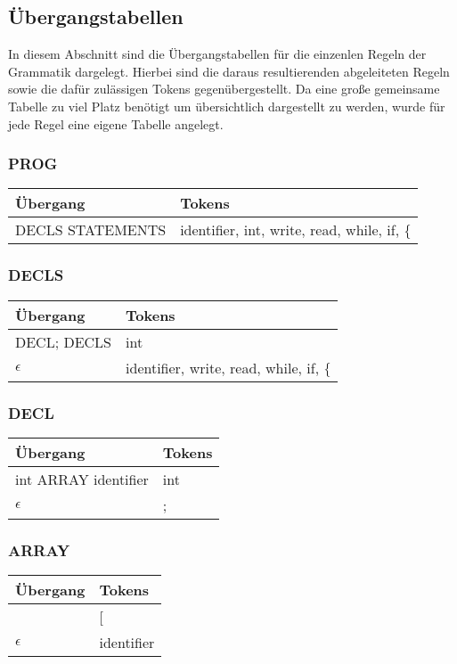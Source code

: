 \documentclass[
a4paper,   %
11pt,      %
oneside,   %
onecolumn, %
final      %
]{article}
\begin{document}
\subsection{\"Ubergangstabellen}
In diesem Abschnitt sind die Übergangstabellen für die einzenlen Regeln der Grammatik dargelegt. Hierbei sind die daraus resultierenden abgeleiteten Regeln sowie die dafür zulässigen Tokens gegenübergestellt.
Da eine große gemeinsame Tabelle zu viel Platz benötigt um übersichtlich dargestellt zu werden, wurde für jede Regel eine eigene Tabelle angelegt.
\newline

\subsubsection{PROG}
\begin{tabular}{| l | l |}
	\hline
		\"Ubergang & Tokens \\
		\hline
		DECLS STATEMENTS & identifier, int, write, read, while, if, \{ \\
	\hline
\end{tabular}
\newline

\subsubsection{DECLS}
\begin{tabular}{| l | l |}
	\hline
		\"Ubergang & Tokens \\
		\hline
		DECL; DECLS & int \\
		$\epsilon$ & identifier, write, read, while, if, $\{$ \\
	\hline
\end{tabular}
\newline

\subsubsection{DECL}
\begin{tabular}{| l | l |}
	\hline
		\"Ubergang & Tokens \\
		\hline
		int ARRAY identifier & int \\
		$\epsilon$ & ; \\
	\hline
\end{tabular}
\newline

\subsubsection{ARRAY}
\begin{tabular}{| l | l |}
	\hline
		\"Ubergang & Tokens \\
		\hline
		[integer] & [ \\
		$\epsilon$ & identifier \\
	\hline
\end{tabular}
\newline
\end{document}
